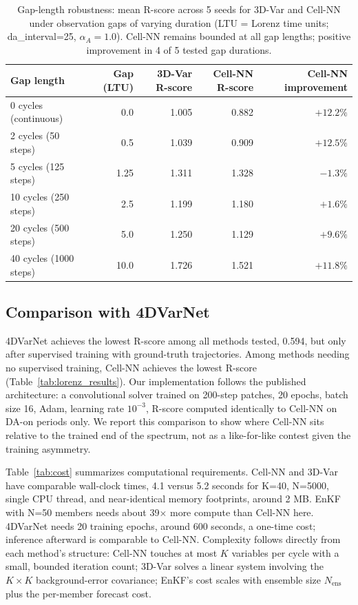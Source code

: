 \documentclass[final,5p,times,twocolumn,authoryear]{elsarticle}
\begin{document}
\begin{table}[t]
\centering
\caption{Gap-length robustness: mean R-score across 5 seeds for
3D-Var and Cell-NN under observation gaps of varying duration
(LTU = Lorenz time units; da\_interval=25, $\alpha_A=1.0$).
Cell-NN remains bounded at all gap lengths; positive improvement
in 4 of 5 tested gap durations.}
\label{tab:gap_length}
\begin{tabular}{lrrrr}
\toprule
Gap length & Gap (LTU) & 3D-Var R-score & Cell-NN R-score & Cell-NN improvement \\
\midrule
0 cycles (continuous)   & 0.0  & 1.005 & 0.882 & $+12.2\%$ \\
2 cycles (50 steps)     & 0.5  & 1.039 & 0.909 & $+12.5\%$ \\
5 cycles (125 steps)    & 1.25 & 1.311 & 1.328 & $-1.3\%$  \\
10 cycles (250 steps)   & 2.5  & 1.199 & 1.180 & $+1.6\%$  \\
20 cycles (500 steps)   & 5.0  & 1.250 & 1.129 & $+9.6\%$  \\
40 cycles (1000 steps)  & 10.0 & 1.726 & 1.521 & $+11.8\%$ \\
\bottomrule
\end{tabular}
\end{table}

\subsection{Comparison with 4DVarNet}

4DVarNet \citep{fablet2021} achieves the lowest R-score among all
methods tested, 0.594, but only after supervised training with
ground-truth trajectories. Among methods needing no supervised
training, Cell-NN achieves the lowest R-score
(Table~\ref{tab:lorenz_results}). Our implementation follows the
published architecture: a convolutional solver trained on 200-step
patches, 20 epochs, batch size 16, Adam, learning rate $10^{-3}$,
R-score computed identically to Cell-NN on DA-on periods only. We
report this comparison to show where Cell-NN sits relative to the
trained end of the spectrum, not as a like-for-like contest given
the training asymmetry.

Table~\ref{tab:cost} summarizes computational requirements. Cell-NN
and 3D-Var have comparable wall-clock times, 4.1 versus 5.2 seconds
for K=40, N=5000, single CPU thread, and near-identical memory
footprints, around 2 MB. EnKF with N=50 members needs about
39$\times$ more compute than Cell-NN here. 4DVarNet needs 20 training
epochs, around 600 seconds, a one-time cost; inference afterward is
comparable to Cell-NN. Complexity follows directly from each method's
structure: Cell-NN touches at most $K$ variables per cycle with a
small, bounded iteration count; 3D-Var solves a linear system
involving the $K\times K$ background-error covariance; EnKF's cost
scales with ensemble size $N_\text{ens}$ plus the per-member forecast
cost.
\end{document}
